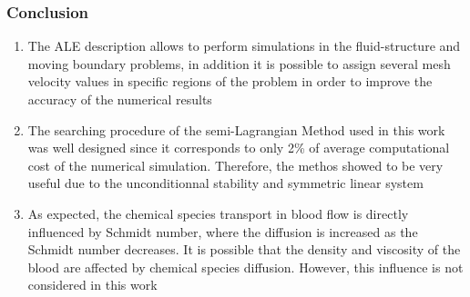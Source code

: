 
\begin{frame}
 \frametitle{\LARGE Conclusion}
 \vspace{-1cm}
\begin{enumerate}
 \justifying
 \small

 
%
%
%

 \item The ALE description allows to perform simulations in the fluid-structure and moving boundary problems, in addition it is possible to assign
several mesh velocity values in specific regions of the problem
in order to improve the accuracy of the numerical results\\

 \vspace{0.3cm}

 \item The searching procedure of the semi-Lagrangian Method
used in this work
was well designed since it corresponds to only 2\% of
average computational cost of the numerical simulation.
Therefore, the methos showed to be very useful 
 due to the unconditionnal stability and symmetric linear system\\

 \vspace{0.3cm}

 \item As expected, the chemical species transport in blood flow
is directly influenced by Schmidt number, where the diffusion is
increased as the Schmidt number decreases. It is possible that
the density and viscosity of the blood are affected by 
chemical species diffusion. However, this influence is not considered
in this work

\end{enumerate}
\end{frame}


